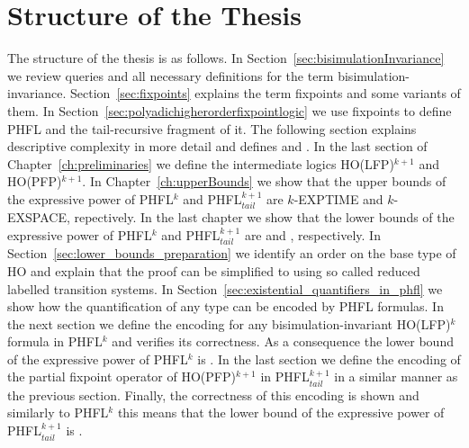 \section*{Structure of the Thesis}
The structure of the thesis is as follows. In Section~\ref{sec:bisimulationInvariance} we review queries and all necessary definitions for the term bisimulation-invariance. Section~\ref{sec:fixpoints} explains the term fixpoints and some variants of them. In Section~\ref{sec:polyadichigherorderfixpointlogic} we use fixpoints to define PHFL and the tail-recursive fragment of it. The following section explains descriptive complexity in more detail and defines  and . In the last section of Chapter~\ref{ch:preliminaries} we define the intermediate logics HO(LFP)$^{k+1}$ and HO(PFP)$^{k+1}$. In Chapter~\ref{ch:upperBounds} we show that the upper bounds of the expressive power of PHFL$^k$ and PHFL$^{k+1}_{tail}$ are $k$-EXPTIME and $k$-EXSPACE, repectively. In the last chapter we show that the lower bounds of the expressive power of PHFL$^k$ and PHFL$^{k+1}_{tail}$ are  and , respectively. In Section~\ref{sec:lower_bounds_preparation} we identify an order on the base type of HO and explain that the proof can be simplified to using so called reduced labelled transition systems. In Section~\ref{sec:existential_quantifiers_in_phfl} we show how the quantification of any type can be encoded by PHFL formulas. In the next section we define the encoding for any bisimulation-invariant HO(LFP)$^k$ formula in PHFL$^k$ and verifies its correctness. As a consequence the lower bound of the expressive power of PHFL$^k$ is . In the last section we define the encoding of the partial fixpoint operator of HO(PFP)$^{k+1}$ in PHFL$^{k+1}_{tail}$ in a similar manner as the previous section. Finally, the correctness of this encoding is shown and similarly to PHFL$^k$ this means that the lower bound of the expressive power of PHFL$^{k+1}_{tail}$ is .
